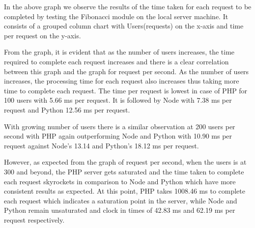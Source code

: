 \documentclass[../thesis.tex]{subfiles}
\begin{document}
\newpage
In the above graph we observe the results of the time taken for each request to be completed by testing the Fibonacci module on the local server machine. It consists of a grouped column chart with Users(requests) on the x-axis and time per request on the y-axis.
\newline

From the graph, it is evident that as the number of users increases, the time required to complete each request increases and there is a clear correlation between this graph and the graph for request per second. As the number of users increases, the processing time for each request also increases thus taking more time to complete each request. The time per request is lowest in case of PHP for 100 users with 5.66 ms per request. It is followed by Node with 7.38 ms per request and Python 12.56 ms per request.
\newline

With growing number of users there is a similar observation at 200 users per second with PHP again outperforming Node and Python with 10.90 ms per request against Node's 13.14 and Python's 18.12 ms per request.
\newline

However, as expected from the graph of request per second, when the users is at 300 and beyond, the PHP server gets saturated and the time taken to complete each request skyrockets in comparison to Node and Python which have more consistent results as expected. At this point, PHP takes 1008.46 ms to complete each request which indicates a saturation point in the server, while Node and Python remain unsaturated and clock in times of 42.83 ms and 62.19 ms per request respectively.
\newpage
\end{document}
